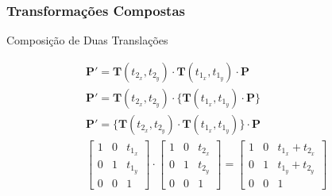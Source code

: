 \documentclass{beamer}
\begin{document}
\begin{frame}
\frametitle{Transformações Compostas}
	\begin{block}{Composição de Duas Translações}
		
			
		\begin{eqnarray*}
			\textbf{P}' = \textbf{T}(t_{2_x},t_{2_y}) \cdot \textbf{T}(t_{1_x},t_{1_y}) \cdot \textbf{P} \\
			\textbf{P}' = \textbf{T}(t_{2_x},t_{2_y}) \cdot \{\textbf{T}(t_{1_x},t_{1_y}) \cdot \textbf{P} \} \\
			\textbf{P}' = \{\textbf{T}(t_{2_x},t_{2_y}) \cdot \textbf{T}(t_{1_x},t_{1_y}) \} \cdot \textbf{P}  \\
			\begin{bmatrix}
					1	& 0 	& t_{1_x} \\
					0 	& 1	& t_{1_y} \\
					0	& 0	& 1
			\end{bmatrix}
			\cdot \begin{bmatrix}
					1	& 0 	& t_{2_x} \\
					0 	& 1	& t_{2_y} \\
					0	& 0	& 1
			\end{bmatrix}
			= \begin{bmatrix}
					1	& 0 	& t_{1_x} + t_{2_x} \\
					0 	& 1	& t_{1_y} + t_{2_y}\\
					0	& 0	& 1
			\end{bmatrix}
		\end{eqnarray*}
				

	\end{block}
\end{frame}

\end{document}
